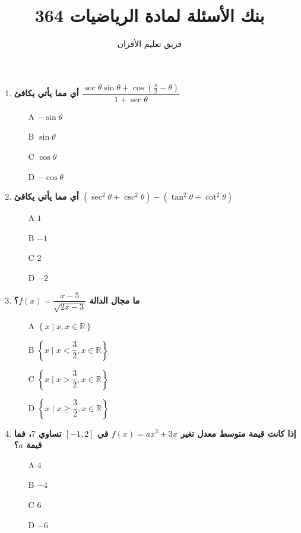 \documentclass{article}
\title{بنك الأسئلة لمادة الرياضيات 364}
\author{فريق تعليم الأقران}
\begin{document}
\maketitle

\begin{enumerate}

\item \textbf{أي مما يأتي يكافئ $\dfrac{\sec\theta\sin\theta + \cos\left(\frac{\pi}{2} - \theta\right)}{1 + \sec\theta}$}
\begin{enumerate}
    \item[A] $-\sin\theta$
    \item[B] $\sin\theta$
    \item[C] $\cos\theta$
    \item[D] $-\cos\theta$
\end{enumerate}

\item \textbf{أي مما يأتي يكافئ $\left(\sec ^2 \theta+\csc ^2 \theta\right)-\left(\tan ^2 \theta+\cot ^2 \theta\right)$}

\begin{enumerate}
    \item[A] $1$
    \item[B] $-1$
    \item[C] $2$
    \item[D] $-2$
\end{enumerate}

\item \textbf{ما مجال الدالة $f(x) = \dfrac{x - 5}{\sqrt{2x-3}}$؟}
\begin{enumerate}
    \item[A] $\left\{x \mid x, x \in \mathbb{R}\right\}$
    \item[B] $\left\{x \mid x < \dfrac{3}{2}, x \in \mathbb{R}\right\}$
    \item[C] $\left\{x \mid x > \dfrac{3}{2}, x \in \mathbb{R}\right\}$
    \item[D] $\left\{x \mid x \geq \dfrac{3}{2}, x \in \mathbb{R}\right\}$
\end{enumerate}

\item \textbf{إذا كانت قيمة متوسط معدل تغير $f(x) = ax^2 + 3x$ في $[-1, 2]$ تساوي $7$، فما قيمة $a$؟}
\begin{enumerate}
    \item[A] $4$
    \item[B] $-4$
    \item[C] $6$
    \item[D] $-6$
\end{enumerate}


\end{enumerate}
\end{document}
